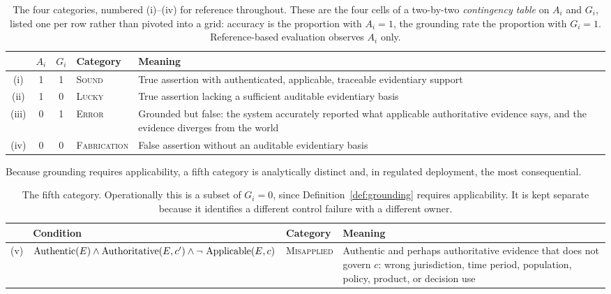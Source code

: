 \begin{table}[H]
  \centering
  \begin{tabular}{@{}ccc>{\raggedright\arraybackslash}p{2.4cm}>{\raggedright\arraybackslash}p{6.6cm}@{}}
    \toprule
    & $A_i$ & $G_i$ & Category & Meaning \\
    \midrule
    (i) & 1 & 1 & \textsc{Sound}
      & True assertion with authenticated, applicable, traceable evidentiary
        support \\
    \addlinespace
    (ii) & 1 & 0 & \textsc{Lucky}
      & True assertion lacking a sufficient auditable evidentiary basis \\
    \addlinespace
    (iii) & 0 & 1 & \textsc{Error}
      & Grounded but false: the system accurately reported what applicable
        authoritative evidence says, and the evidence diverges from the world \\
    \addlinespace
    (iv) & 0 & 0 & \textsc{Fabrication}
      & False assertion without an auditable evidentiary basis \\
    \bottomrule
  \end{tabular}
  \caption{The four categories, numbered (i)--(iv) for reference throughout. These
    are the four cells of a two-by-two \emph{contingency table} on $A_i$ and $G_i$,
    listed one per row rather than pivoted into a grid: accuracy is the proportion
    with $A_i = 1$, the grounding rate the proportion with $G_i = 1$.
    Reference-based evaluation observes $A_i$ only.}
  \label{tab:taxonomy}
\end{table}

Because grounding requires applicability, a fifth category is analytically
distinct and, in regulated deployment, the most consequential.

\begin{table}[H]
  \centering
  \begin{tabular}{@{}c>{\raggedright\arraybackslash}p{5.0cm}>{\raggedright\arraybackslash}p{2.2cm}>{\raggedright\arraybackslash}p{4.8cm}@{}}
    \toprule
    & Condition & Category & Meaning \\
    \midrule
    (v) & $\operatorname{Authentic}(E) \wedge \operatorname{Authoritative}(E, c') \wedge \neg\,\operatorname{Applicable}(E, c)$
      & \textsc{Misapplied}
      & Authentic and perhaps authoritative evidence that does not govern $c$:
        wrong jurisdiction, time period, population, policy, product, or decision
        use \\
    \bottomrule
  \end{tabular}
  \caption{The fifth category. Operationally this is a subset of
    $G_i = 0$, since Definition~\ref{def:grounding} requires applicability. It is
    kept separate because it identifies a different control failure with a
    different owner.}
  \label{tab:misapplied}
\end{table}

